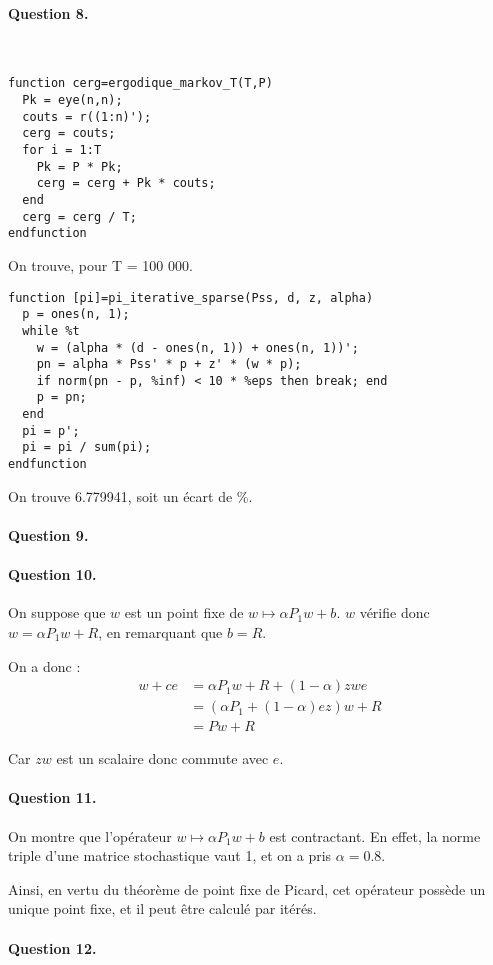\documentclass[12pt,a4paper]{article}
\begin{document}
\paragraph*{Question 8.}
~
\begin{lstlisting}
function cerg=ergodique_markov_T(T,P)
  Pk = eye(n,n);
  couts = r((1:n)');
  cerg = couts;
  for i = 1:T
    Pk = P * Pk;
    cerg = cerg + Pk * couts;
  end
  cerg = cerg / T;
endfunction
\end{lstlisting}

On trouve, pour T = 100 000.

\begin{lstlisting}
function [pi]=pi_iterative_sparse(Pss, d, z, alpha)
  p = ones(n, 1);
  while %t
    w = (alpha * (d - ones(n, 1)) + ones(n, 1))';
    pn = alpha * Pss' * p + z' * (w * p);
    if norm(pn - p, %inf) < 10 * %eps then break; end
    p = pn;
  end
  pi = p';
  pi = pi / sum(pi);
endfunction
\end{lstlisting}

On trouve 6.779941, soit un écart de \%.

\paragraph*{Question 9.}

\paragraph*{Question 10.}
On suppose que $w$ est un point fixe de $w \mapsto \alpha P_1 w + b$. $w$ vérifie donc $w = \alpha P_1 w + R$, en remarquant que $b = R$.

On a donc :
\begin{align*}
    w + c e &= \alpha P_1 w + R + (1 - \alpha) z w e\\
    &= (\alpha P_1 + (1 - \alpha) e z)w + R \\
    &= P w + R
\end{align*}

Car $zw$ est un scalaire donc commute avec $e$.

\paragraph*{Question 11.}
On montre que l'opérateur $w \mapsto \alpha P_1 w + b$ est contractant. En effet, la norme triple d'une matrice stochastique vaut 1, et on a pris $\alpha = 0.8$.

Ainsi, en vertu du théorème de point fixe de Picard, cet opérateur possède un unique point fixe, et il peut être calculé par itérés.

\paragraph*{Question 12.}
\end{document}
